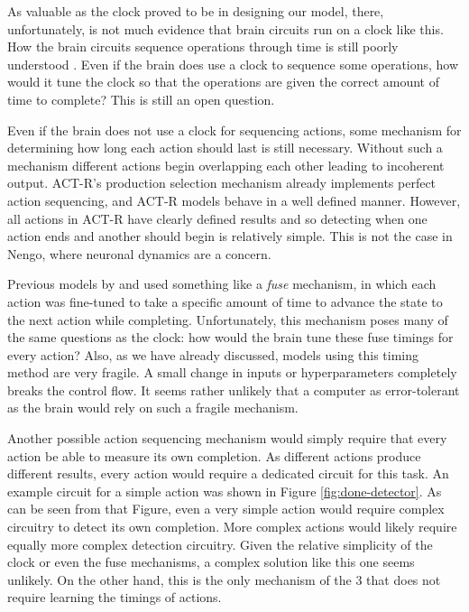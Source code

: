\documentclass[10pt, a4paper, twocolumn]{article}
\begin{document}
As valuable as the clock proved to be in designing our model, there, unfortunately, is not much evidence that brain circuits run on a clock like this. How the brain circuits sequence operations through time is still poorly understood \citep{Finnerty2015}. Even if the brain does use a clock to sequence some operations, how would it tune the clock so that the operations are given the correct amount of time to complete? This is still an open question.

Even if the brain does not use a clock for sequencing actions, some mechanism for determining how long each action should last is still necessary. Without such a mechanism different actions begin overlapping each other leading to incoherent output. ACT-R's production selection mechanism already implements perfect action sequencing, and ACT-R models behave in a well defined manner. However, all actions in ACT-R have clearly defined results and so detecting when one action ends and another should begin is relatively simple. This is not the case in Nengo, where neuronal dynamics are a concern.

Previous models by \cite{Aubin2016} and \cite{Praetorius} used something like a \emph{fuse} mechanism, in which each action was fine-tuned to take a specific amount of time to advance the state to the next action while completing. Unfortunately, this mechanism poses many of the same questions as the clock: how would the brain tune these fuse timings for every action? Also, as we have already discussed, models using this timing method are very fragile. A small change in inputs or hyperparameters completely breaks the control flow. It seems rather unlikely that a computer as error-tolerant as the brain would rely on such a fragile mechanism.

Another possible action sequencing mechanism would simply require that every action be able to measure its own completion. As different actions produce different results, every action would require a dedicated circuit for this task. An example circuit for a simple action was shown in Figure \ref{fig:done-detector}. As can be seen from that Figure, even a very simple action would require complex circuitry to detect its own completion. More complex actions would likely require equally more complex detection circuitry. Given the relative simplicity of the clock or even the fuse mechanisms, a complex solution like this one seems unlikely. On the other hand, this is the only mechanism of the 3 that does not require learning the timings of actions.
\end{document}
